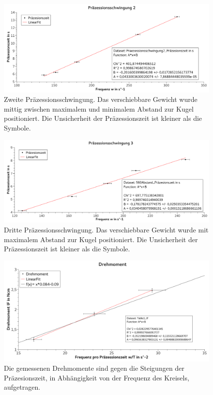 \documentclass[
	a4paper,
	12pt,
	pagesize,
	ngerman
]{scrartcl}
\begin{document}
	\begin{figure}[tb]
		\includegraphics[width=1\textwidth]{Praez2}
		\centering
		\caption{Zweite Präzessionsschwingung. Das verschiebbare Gewicht wurde mittig zwischen maximalem und minimalem Abstand zur Kugel positioniert. Die Unsicherheit der Präzessionszeit ist kleiner als die Symbole.}
		\label{Praez2}
		\centering
	\end{figure}

	\begin{figure}[tb]
		\includegraphics[width=1\textwidth]{Praez3}
		\centering
		\caption{Dritte Präzessionsschwingung. Das verschiebbare Gewicht wurde mit maximalem Abstand zur Kugel positioniert. Die Unsicherheit der Präzessionszeit ist kleiner als die Symbole.}
		\label{Praez3}
		\centering
	\end{figure}

	\begin{figure}[tb]
		\includegraphics[width=1\textwidth]{Drehmoment}
		\centering
		\caption{Die gemessenen Drehmomente sind gegen die Steigungen der Präzesionszeit, in Abhängigkeit von der Frequenz des Kreisels, aufgetragen.} %
		\label{Drehmoment}
		\centering
	\end{figure}
\end{document}
